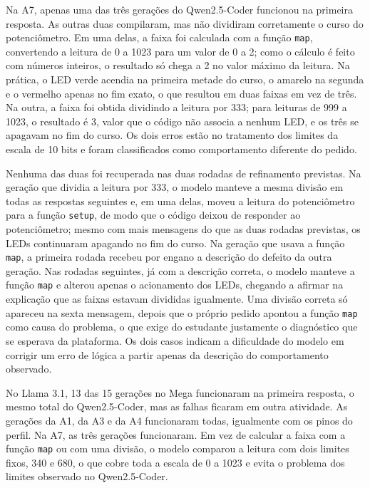 Na A7, apenas uma das três gerações do Qwen2.5-Coder funcionou na primeira resposta. As outras duas compilaram, mas não dividiram corretamente o curso do potenciômetro. Em uma delas, a faixa foi calculada com a função \texttt{map}, convertendo a leitura de 0 a 1023 para um valor de 0 a 2; como o cálculo é feito com números inteiros, o resultado só chega a 2 no valor máximo da leitura. Na prática, o LED verde acendia na primeira metade do curso, o amarelo na segunda e o vermelho apenas no fim exato, o que resultou em duas faixas em vez de três. Na outra, a faixa foi obtida dividindo a leitura por 333; para leituras de 999 a 1023, o resultado é 3, valor que o código não associa a nenhum LED, e os três se apagavam no fim do curso. Os dois erros estão no tratamento dos limites da escala de 10 bits e foram classificados como comportamento diferente do pedido.

Nenhuma das duas foi recuperada nas duas rodadas de refinamento previstas. Na geração que dividia a leitura por 333, o modelo manteve a mesma divisão em todas as respostas seguintes e, em uma delas, moveu a leitura do potenciômetro para a função \texttt{setup}, de modo que o código deixou de responder ao potenciômetro; mesmo com mais mensagens do que as duas rodadas previstas, os LEDs continuaram apagando no fim do curso. Na geração que usava a função \texttt{map}, a primeira rodada recebeu por engano a descrição do defeito da outra geração. Nas rodadas seguintes, já com a descrição correta, o modelo manteve a função \texttt{map} e alterou apenas o acionamento dos LEDs, chegando a afirmar na explicação que as faixas estavam divididas igualmente. Uma divisão correta só apareceu na sexta mensagem, depois que o próprio pedido apontou a função \texttt{map} como causa do problema, o que exige do estudante justamente o diagnóstico que se esperava da plataforma. Os dois casos indicam a dificuldade do modelo em corrigir um erro de lógica a partir apenas da descrição do comportamento observado.

No Llama 3.1, 13 das 15 gerações no Mega funcionaram na primeira resposta, o mesmo total do Qwen2.5-Coder, mas as falhas ficaram em outra atividade. As gerações da A1, da A3 e da A4 funcionaram todas, igualmente com os pinos do perfil. Na A7, as três gerações funcionaram. Em vez de calcular a faixa com a função \texttt{map} ou com uma divisão, o modelo comparou a leitura com dois limites fixos, 340 e 680, o que cobre toda a escala de 0 a 1023 e evita o problema dos limites observado no Qwen2.5-Coder.

